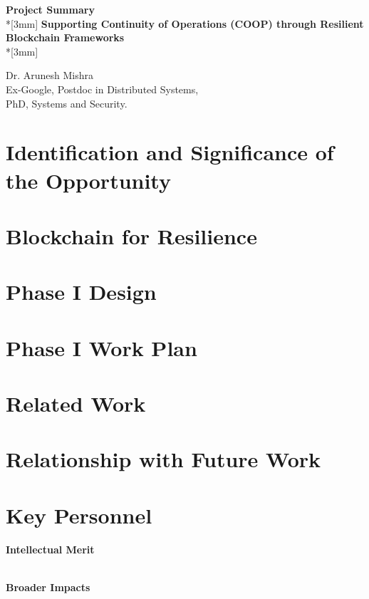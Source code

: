 \documentclass{proposal}
\begin{document}
\begin{center}
{{\bf Project Summary}}\\*[3mm]
{\Large \bf Supporting Continuity of Operations (COOP) through Resilient Blockchain Frameworks } \\*[3mm]

Dr. Arunesh Mishra\\
Ex-Google, Postdoc in Distributed Systems,\\ PhD, Systems and Security.

\end{center}
\section{Identification and Significance of the Opportunity}

\cite{sample_ref}

\section{Blockchain for Resilience}


\section{Phase I Design}

\section{Phase I Work Plan}
\section{Related Work}



\section{Relationship with Future Work}


\section{Key Personnel}



\noindent
{\bf Intellectual Merit}

\ \\

\noindent
{\bf Broader Impacts}





\newpage
{}
\renewcommand{\thepage} {E--\arabic{page}}




%
\end{document}
